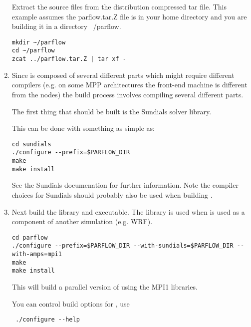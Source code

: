 \begin{enumerate}
Extract the source files from the distribution compressed tar file.
This example assumes the parflow.tar.Z file is in your home directory
and you are building it in a directory ~/parflow.

\begin{display}\begin{verbatim}
mkdir ~/parflow
cd ~/parflow
zcat ../parflow.tar.Z | tar xf -
\end{verbatim}\end{display}


\item

Since \parflow{} is composed of several different parts which might
require different compilers (e.g. on some MPP architectures the
front-end machine is different from the nodes) the build process
involves compiling several different parts.

The first thing that should be built is the Sundials solver library.

This can be done with something as simple as:

\begin{display}\begin{verbatim}
cd sundials
./configure --prefix=$PARFLOW_DIR
make
make install
\end{verbatim}\end{display}

See the Sundials documenation for further information.  Note the
compiler choices for Sundials should probably also be used when
building \parflow{}.

\item

Next build the \parflow{} library and executable.  The library is
used when \parflow{} is used as a component of another simulation
(e.g. WRF).  

\begin{display}\begin{verbatim}
cd parflow
./configure --prefix=$PARFLOW_DIR --with-sundials=$PARFLOW_DIR --with-amps=mpi1
make 
make install
\end{verbatim}\end{display}

This will build a parallel version of \parflow{} using the MPI1
libraries.

You can control build options for \parflow{}, use

\begin{display}\begin{verbatim}
 ./configure --help 
\end{verbatim}\end{display}


\end{enumerate}

